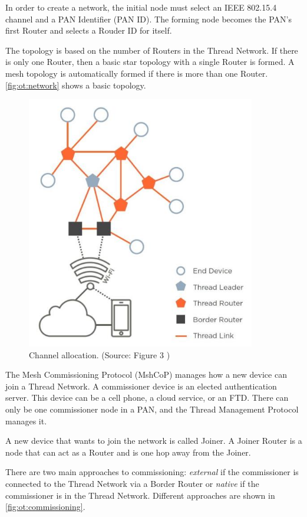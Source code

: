 In order to create a network, the initial node must select an IEEE 802.15.4 channel and
a PAN Identifier (PAN ID).
The forming node becomes the PAN's first Router and selects a Rouder ID for itself.

The topology is based on the number of Routers in the Thread Network.
If there is only one Router, then a basic star topology with a single Router is formed.
A mesh topology is automatically formed if there is more than one Router.
\autoref{fig:ot:network} shows a basic topology.

\begin{figure}[!ht]
    \centering
    \includegraphics[width=100mm, keepaspectratio]{figures/thread-topology-ThreadNetworkFundamentals_633_4.jpg}
    \caption{Channel allocation. (Source: Figure 3 \cite{thread:nfwp})}
    \label{fig:ot:network}
\end{figure}

The Mesh Commissioning Protocol (MshCoP) manages how a new device can join a Thread Network.
A commissioner device is an elected authentication server.
This device can be a cell phone, a cloud service, or an FTD.
There can only be one commissioner node in a PAN, and the Thread Management Protocol manages it.

A new device that wants to join the network is called Joiner.
A Joiner Router is a node that can act as a Router and is one hop away from the Joiner.

There are two main approaches to commissioning:
\emph{external} if the commissioner is connected to the Thread Network via a Border Router or
\emph{native} if the commissioner is in the Thread Network. 
Different approaches are shown in \autoref{fig:ot:commissioning}.

